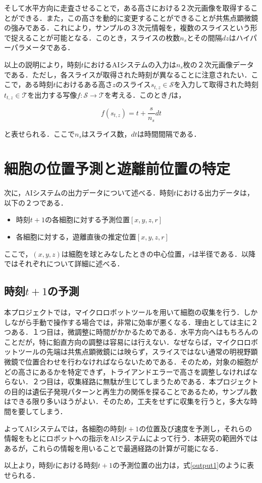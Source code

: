 そして水平方向に走査させることで，ある高さにおける２次元画像を取得することができる．また，この高さを動的に変更することができることが共焦点顕微鏡の強みである．これにより，サンプルの３次元情報を，複数のスライスという形で捉えることが可能となる．このとき，スライスの枚数$n_s$とその間隔$dz$はハイパーパラメータである．
\par
以上の説明により，時刻$t$におけるAIシステムの入力は$n_s$枚の２次元画像データである．ただし，各スライスが取得された時刻が異なることに注意されたい．ここで，ある時刻$t$におけるある高さ$z$のスライス$s_{t,z} \in \mathcal{S}$を入力して取得された時刻$t_{t,z} \in \mathcal{T}$を出力する写像$f:\mathcal{S} \rightarrow \mathcal{T}$を考える．このとき$f$は，

\begin{equation}
    f(s_{t,z}) = t + \frac{s}{n_s} dt
    \label{slice-time}
\end{equation}

と表せられる．ここで$n_s$はスライス数，$dt$は時間間隔である．

\section{細胞の位置予測と遊離前位置の特定}
次に，AIシステムの出力データについて述べる．時刻$t$における出力データは，以下の２つである．
\begin{itemize}
    \item 時刻$t+1$の各細胞に対する予測位置$\left[x, y, z, r\right]$
    \item 各細胞に対する，遊離直後の推定位置$\left[x, y, z, r\right]$
\end{itemize}
ここで，$\left(x,y,z\right)$は細胞を球とみなしたときの中心位置，$r$は半径である．以降ではそれぞれについて詳細に述べる．
\subsection{時刻$t+1$の予測}
本プロジェクトでは，マイクロロボットツールを用いて細胞の収集を行う．しかしながら手動で操作する場合では，非常に効率が悪くなる．理由としては主に２つある．１つ目は，微調整に時間がかかるためである．水平方向へはもちろんのことだが，特に鉛直方向の調整は容易には行えない．なぜならば，マイクロロボットツールの先端は共焦点顕微鏡には映らず，スライスではない通常の明視野顕微鏡で位置合わせを行わなければならないためである．そのため，対象の細胞がどの高さにあるかを特定できず，トライアンドエラーで高さを調整しなければならない．２つ目は，収集経路に無駄が生じてしまうためである．本プロジェクトの目的は遺伝子発現パターンと再生力の関係を探ることであるため，サンプル数はできる限り多いほうがよい．そのため，工夫をせずに収集を行うと，多大な時間を要してしまう．
\par
よってAIシステムでは，各細胞の時刻$t+1$の位置及び速度を予測し，それらの情報をもとにロボットへの指示をAIシステムによって行う．本研究の範囲外ではあるが，これらの情報を用いることで最適経路の計算が可能になる．
\par
以上より，時刻$t$における時刻$t+1$の予測位置の出力は，式\eqref{output1}のように表せられる．

